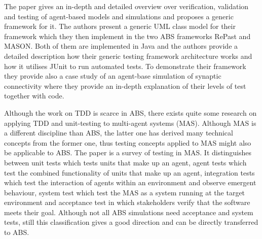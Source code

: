 The paper \cite{gurcan_generic_2013} gives an in-depth and detailed overview over verification, validation and testing of agent-based models and simulations and proposes a generic framework for it. The authors present a generic UML class model for their framework which they then implement in the two ABS frameworks RePast and MASON. Both of them are implemented in Java and the authors provide a detailed description how their generic testing framework architecture works and how it utilises JUnit to run automated tests. To demonstrate their framework they provide also a case study of an agent-base simulation of synaptic connectivity where they provide an in-depth explanation of their levels of test together with code.


Although the work on TDD is scarce in ABS, there exists quite some research on applying TDD and unit-testing to multi-agent systems (MAS). Although MAS is a different discipline than ABS, the latter one has derived many technical concepts from the former one, thus testing concepts applied to MAS might also be applicable to ABS. The paper \cite{nguyen_testing_2011} is a survey of testing in MAS. It distinguishes between unit tests which tests units that make up an agent, agent tests which test the combined functionality of units that make up an agent, integration tests which test the interaction of agents within an environment and observe emergent behaviour, system test which test the MAS as a system running at the target environment and acceptance test in which stakeholders verify that the software meets their goal. Although not all ABS simulations need acceptance and system tests, still this classification gives a good direction and can be directly transferred to ABS.  %



